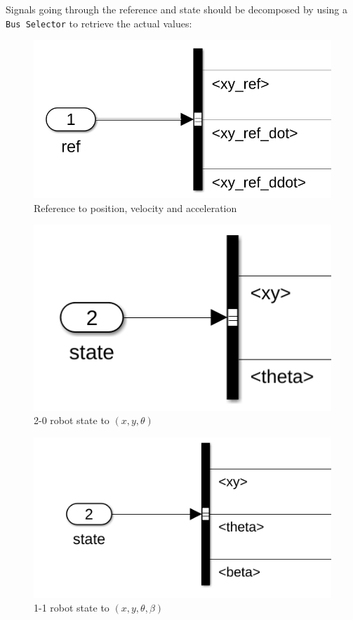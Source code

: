 \documentclass{ecnreport}
\begin{document}
Signals going through the reference and state should be decomposed by using a \texttt{Bus Selector} to retrieve the actual values:
\begin{figure}[h]
\begin{minipage}[c]{0.32\linewidth}
\centering
\includegraphics[height=0.4\linewidth, valign=c]{ref} \\ \footnotesize Reference to position, velocity and acceleration
\end{minipage}
\begin{minipage}[c]{0.32\linewidth}
\centering
\includegraphics[height=0.4\linewidth, valign=c]{state20} \\ \footnotesize 2-0 robot state to $(x, y, \theta)$
\end{minipage}
\begin{minipage}[c]{0.32\linewidth}
\centering
\includegraphics[height=0.4\linewidth, valign=c]{state11} \\ \footnotesize 1-1 robot state to $(x,y,\theta,\beta)$
\end{minipage}
\end{figure}
\end{document}
